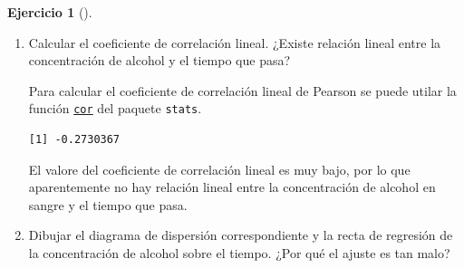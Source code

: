 \documentclass[
  spanish,
  a4paper,
]{scrreport}
\newenvironment{Shaded}{\begin{snugshade}}{\end{snugshade}}
\newcommand{\FunctionTok}[1]{\textcolor[rgb]{0.28,0.35,0.67}{#1}}
\newcommand{\NormalTok}[1]{\textcolor[rgb]{0.00,0.23,0.31}{#1}}
\newcommand{\SpecialCharTok}[1]{\textcolor[rgb]{0.37,0.37,0.37}{#1}}
\theoremstyle{definition}
\newtheorem{exercise}{Ejercicio}[chapter]
\theoremstyle{remark}
\begin{document}
\begin{exercise}[]
\begin{enumerate}
\begin{tcolorbox}
  \end{tcolorbox}
\item
  Calcular el coeficiente de correlación lineal. ¿Existe relación lineal
  entre la concentración de alcohol y el tiempo que pasa?

  \begin{tcolorbox}[enhanced jigsaw, arc=.35mm, bottomrule=.15mm, bottomtitle=1mm, breakable, colback=white, colbacktitle=quarto-callout-tip-color!10!white, colframe=quarto-callout-tip-color-frame, coltitle=black, left=2mm, leftrule=.75mm, opacityback=0, opacitybacktitle=0.6, rightrule=.15mm, title=\textcolor{quarto-callout-tip-color}{\faLightbulb}\hspace{0.5em}{Solución}, titlerule=0mm, toprule=.15mm, toptitle=1mm]

  Para calcular el coeficiente de correlación lineal de Pearson se puede
  utilar la función
  \href{https://www.rdocumentation.org/packages/stats/versions/3.6.2/topics/cor}{\texttt{cor}}
  del paquete \texttt{stats}.

\begin{Shaded}
\end{Shaded}

\begin{verbatim}
[1] -0.2730367
\end{verbatim}

  El valore del coeficiente de correlación lineal es muy bajo, por lo
  que aparentemente no hay relación lineal entre la concentración de
  alcohol en sangre y el tiempo que pasa.

  \end{tcolorbox}
\item
  Dibujar el diagrama de dispersión correspondiente y la recta de
  regresión de la concentración de alcohol sobre el tiempo. ¿Por qué el
  ajuste es tan malo?

  \begin{tcolorbox}[enhanced jigsaw, arc=.35mm, bottomrule=.15mm, bottomtitle=1mm, breakable, colback=white, colbacktitle=quarto-callout-tip-color!10!white, colframe=quarto-callout-tip-color-frame, coltitle=black, left=2mm, leftrule=.75mm, opacityback=0, opacitybacktitle=0.6, rightrule=.15mm, title=\textcolor{quarto-callout-tip-color}{\faLightbulb}\hspace{0.5em}{Solución}, titlerule=0mm, toprule=.15mm, toptitle=1mm]


\end{tcolorbox}
\end{enumerate}
\end{exercise}
\end{document}
